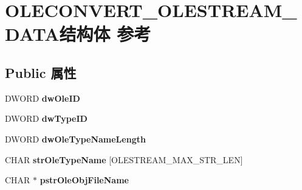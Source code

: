\hypertarget{struct_o_l_e_c_o_n_v_e_r_t___o_l_e_s_t_r_e_a_m___d_a_t_a}{}\section{O\+L\+E\+C\+O\+N\+V\+E\+R\+T\+\_\+\+O\+L\+E\+S\+T\+R\+E\+A\+M\+\_\+\+D\+A\+T\+A结构体 参考}
\label{struct_o_l_e_c_o_n_v_e_r_t___o_l_e_s_t_r_e_a_m___d_a_t_a}
\subsection*{Public 属性}
\begin{DoxyCompactItemize}
\item 
\mbox{\label{struct_o_l_e_c_o_n_v_e_r_t___o_l_e_s_t_r_e_a_m___d_a_t_a_a176ebc113c10122e78b3e63fa5523d39}} 
D\+W\+O\+RD {\bfseries dw\+Ole\+ID}
\item 
\mbox{\label{struct_o_l_e_c_o_n_v_e_r_t___o_l_e_s_t_r_e_a_m___d_a_t_a_a5fffedcdff4f1f8e494a46e4cf1eeec8}} 
D\+W\+O\+RD {\bfseries dw\+Type\+ID}
\item 
\mbox{\label{struct_o_l_e_c_o_n_v_e_r_t___o_l_e_s_t_r_e_a_m___d_a_t_a_a0c041df46324b5fa1fec0e4f12d4d25f}} 
D\+W\+O\+RD {\bfseries dw\+Ole\+Type\+Name\+Length}
\item 
\mbox{\label{struct_o_l_e_c_o_n_v_e_r_t___o_l_e_s_t_r_e_a_m___d_a_t_a_a0d940dc8c461e71cbb6672b8c3654f5c}} 
C\+H\+AR {\bfseries str\+Ole\+Type\+Name} \mbox{[}O\+L\+E\+S\+T\+R\+E\+A\+M\+\_\+\+M\+A\+X\+\_\+\+S\+T\+R\+\_\+\+L\+EN\mbox{]}
\item 
\mbox{\label{struct_o_l_e_c_o_n_v_e_r_t___o_l_e_s_t_r_e_a_m___d_a_t_a_a9c05ec997bf7a9abab7cb0ad85fa066e}} 
C\+H\+AR $\ast$ {\bfseries pstr\+Ole\+Obj\+File\+Name}
\item 
\mbox{\label{struct_o_l_e_c_o_n_v_e_r_t___o_l_e_s_t_r_e_a_m___d_a_t_a_abeb59f0d75bdfc2cd21f1525f2e22ec8}} 

\end{DoxyCompactItemize}
